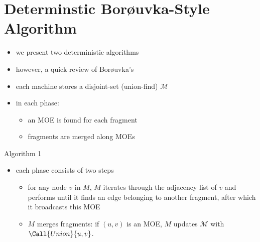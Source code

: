 \section{Determinstic Bor\o{u}vka-Style Algorithm}
\begin{frame}
    \begin{itemize}
        \item we present two deterministic algorithms
        \item however, a quick review of Bor\o{u}vka's
        \item each machine stores a disjoint-set (union-find) $\mathcal{M}$
        \item in each phase:
              \begin{itemize}
                  \item an MOE is found for each fragment
                  \item fragments are merged along MOEs
              \end{itemize}
    \end{itemize}
\end{frame}

\begin{frame}{Algorithm 1}
    \begin{itemize}
        \item each phase consists of two steps
              \begin{itemize}
                  \item for any node $v$ in $M$, $M$ iterates through the adjacency
                        list of $v$ and performs  until it finds an edge belonging
                        to another fragment, after which it broadcasts this MOE
                  \item $M$ merges fragments: if $(u, v)$ is an MOE, $M$ updates $\mathcal{M}$ with $\Call{Union}{u, v}$.
              \end{itemize}
    \end{itemize}
\end{frame}

